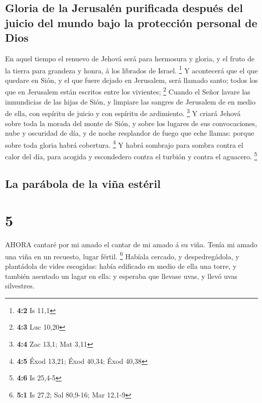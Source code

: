 \hypertarget{gloria-de-la-jerusaluxe9n-purificada-despuuxe9s-del-juicio-del-mundo-bajo-la-protecciuxf3n-personal-de-dios}{%
\subsection{Gloria de la Jerusalén purificada después del juicio del
mundo bajo la protección personal de
Dios}\label{gloria-de-la-jerusaluxe9n-purificada-despuuxe9s-del-juicio-del-mundo-bajo-la-protecciuxf3n-personal-de-dios}}

 En aquel tiempo el renuevo de Jehová será para hermosura y
gloria, y el fruto de la tierra para grandeza y honra, á los librados de
Israel. \footnote{\textbf{4:2} Is 11,1}  Y acontecerá que el
que quedare en Sión, y el que fuere dejado en Jerusalem, será llamado
santo; todos los que en Jerusalem están escritos entre los vivientes;
\footnote{\textbf{4:3} Luc 10,20}  Cuando el Señor lavare
las inmundicias de las hijas de Sión, y limpiare las sangres de
Jerusalem de en medio de ella, con espíritu de juicio y con espíritu de
ardimiento. \footnote{\textbf{4:4} Zac 13,1; Mat 3,11}  Y
criará Jehová sobre toda la morada del monte de Sión, y sobre los
lugares de sus convocaciones, nube y oscuridad de día, y de noche
resplandor de fuego que eche llamas: porque sobre toda gloria habrá
cobertura. \footnote{\textbf{4:5} Éxod 13,21; Éxod 40,34; Éxod 40,38}
 Y habrá sombrajo para sombra contra el calor del día, para
acogida y escondedero contra el turbión y contra el aguacero.
\footnote{\textbf{4:6} Is 25,4-5}

\hypertarget{la-paruxe1bola-de-la-viuxf1a-estuxe9ril}{%
\subsection{La parábola de la viña
estéril}\label{la-paruxe1bola-de-la-viuxf1a-estuxe9ril}}

\hypertarget{section-4}{%
\section{5}\label{section-4}}

 AHORA cantaré por mi amado el cantar de mi amado á su viña.
Tenía mi amado una viña en un recuesto, lugar fértil. \footnote{\textbf{5:1}
  Is 27,2; Sal 80,9-16; Mar 12,1-9}  Habíala cercado, y
despedregádola, y plantádola de vides escogidas: había edificado en
medio de ella una torre, y también asentado un lagar en ella: y esperaba
que llevase uvas, y llevó uvas silvestres.

